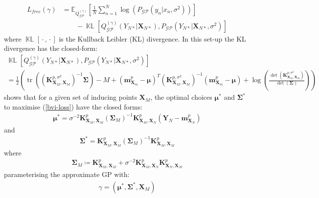 \documentclass{article}
\newcommand{\KLD}{\operatorname{\mathbb{KL}}}
\newcommand{\tr}{\operatorname{tr}}
\newcommand{\GP}{\operatorname{\mathcal{GP}}}
\newcommand{\wc}{\operatorname{{}\cdot{}}}
\numberwithin{equation}{section}
\begin{document}
\begin{align}
    \label{bvi-loss}
    L_{free}(\gamma) &=\mathbb{E}_{Q^{(\gamma)}_{\GP}}\left[\frac{1}{N}\sum_{n=1}^N\log \left(P_{\GP}\left(y_n \vert x_n, \sigma^2\right)\right)\right] \nonumber \\
    & \qquad - \KLD \left[Q^{(\gamma)}_{\GP}\left(Y_{N*} \vert \mathbf{X}_{N*}\right), P_{\GP}\left( Y_{N*} \vert \mathbf{X}_{N*}, \sigma^2\right) \right]
\end{align}
where $\KLD[\wc, \wc]$ is the Kullback Leibler (KL) divergence. In this set-up the KL divergence has the closed-form:
  \begin{multline}
    \KLD \left[Q^{(\gamma)}_{\GP}\left(Y_{N*} \vert \mathbf{X}_{N*}\right), P_{\GP}\left( Y_{N*} \vert \mathbf{X}_{N*}, \sigma^2\right) \right] \\
    = \frac{1}{2}\left( \tr\left(\left(\mathbf{K}^{p, \sigma^2}_{\mathbf{X}_M, \mathbf{X}_M}\right)^{-1} \boldsymbol{\Sigma}\right) - M +
    \left(\mathbf{m}^p_{\mathbf{X}_m} - \boldsymbol{\mu}\right)^T \left(\mathbf{K}^{p, \sigma^2}_{\mathbf{X}_M, \mathbf{X}_M}\right)^{-1} \left(\mathbf{m}^p_{\mathbf{X}_m} - \boldsymbol{\mu}\right)+ \log\left(\frac{\det\left(\mathbf{K}^{p, \sigma^2}_{\mathbf{X}_M, \mathbf{X}_M}\right)}{\det\left(\boldsymbol{\Sigma}\right)}\right) \right)
  \end{multline}
\cite{titsias2009variational} shows that for a given set of inducing points $\mathbf{X}_M$, the optimal choices $\boldsymbol{\mu}^*$ and $\mathbf{\Sigma}^*$ to maximise (\ref{bvi-loss}) have the closed forms:
\begin{align}
    \boldsymbol{\mu}^* = \sigma^{-2}\mathbf{K}^p_{\mathbf{X}_M, \mathbf{X}_M}  \left(\mathbf{\Sigma}_M\right)^{-1}\mathbf{K}^p_{\mathbf{X}_M, \mathbf{X}_N}  \left(\mathbf{Y}_N - \mathbf{m}^p_{\mathbf{X}_N}\right)
\end{align}
and
\begin{align}
    \mathbf{\Sigma}^* = \mathbf{K}^p_{\mathbf{X}_M, \mathbf{X}_M}  \left(\mathbf{\Sigma}_M\right)^{-1}\mathbf{K}^p_{\mathbf{X}_M, \mathbf{X}_M} 
\end{align}
where 
\begin{align}
    \mathbf{\Sigma}_M \coloneqq \mathbf{K}^p_{\mathbf{X}_M, \mathbf{X}_M}  + \sigma^{-2}\mathbf{K}^p_{\mathbf{X}_M, \mathbf{X}_N} \mathbf{K}^p_{\mathbf{X}_N, \mathbf{X}_M} 
\end{align}
parameterising the approximate GP with:
\begin{align}
    \gamma = \left(\boldsymbol{\mu}^*, \mathbf{\Sigma}^*,  \mathbf{X}_M\right)
\end{align}
\end{document}

